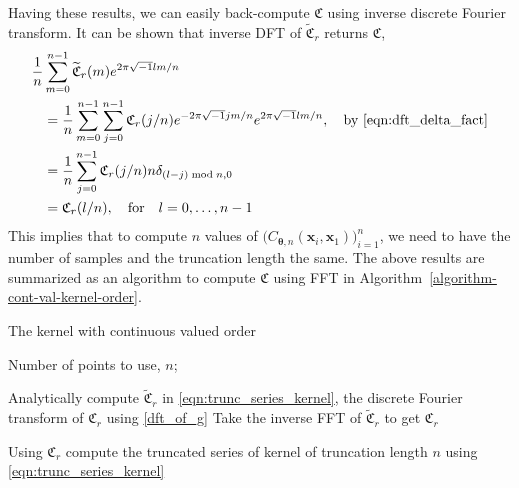\documentclass{svjour3}                     %
\newcommand{\bm}[1]{\boldsymbol{#1}}
\newcommand{\vtheta}{{\bm{\theta}}}
\newcommand{\vx}{\bm{x}}
\begin{document}
Having these results, we can easily back-compute $\mathfrak{C}$ using inverse discrete Fourier transform. It can be shown that inverse DFT of $\widetilde{\mathfrak{C}}_{r}$ returns $\mathfrak{C}$,
\begin{align*}
\frac{1}{n} &\sum_{m=0}^{n-1} \widetilde{\mathfrak{C}}_{r} (m) e^{2 \pi\sqrt{-1} lm/n} \\
& = \frac{1}{n} \sum_{m=0}^{n-1} 
\sum_{j=0}^{n-1} \mathfrak{C}_{r} (j/n) e^{- 2 \pi\sqrt{-1} jm/n}
e^{2 \pi\sqrt{-1} lm/n}, \quad \text{by \eqref{eqn:dft_delta_fact}}  \\
& = \frac{1}{n}  \sum_{j=0}^{n-1} \mathfrak{C}_{r} (j/n) n \delta_{(l-j) \bmod n, 0} \\
& = \mathfrak{C}_{r} (l/n), \quad \text{for} \quad l=0,\dots,n-1
\end{align*}
This implies that to compute $n$ values of $\biggl( C_{\vtheta, n}(\vx_i, \vx_1) \biggr)_{i=1}^n$, we need to have the number of samples and the truncation length the same. 
The above results are summarized as an algorithm to compute $\mathfrak{C}$ using FFT in Algorithm~\ref{algorithm-cont-val-kernel-order}.
\begin{algorithm}
	\caption{The kernel with continuous valued order}\label{algorithm-cont-val-kernel-order}
	\begin{algorithmic}[1]
		
		\Require
		Number of points to use, $n$; 
		
		\State Analytically compute $ \widetilde{\bm{\mathfrak{C}}}_r $ in \eqref{eqn:trunc_series_kernel}, the discrete Fourier transform of ${\bm{\mathfrak{C}}}_r$ using \eqref{dft_of_g}
		\State Take the inverse FFT of $\widetilde{\bm{\mathfrak{C}}}_r$ to get ${\bm{\mathfrak{C}}}_r$
		
		\State Using ${\bm{\mathfrak{C}}}_r$ compute the truncated series of kernel of truncation length $n$ using \eqref{eqn:trunc_series_kernel}
		
	\end{algorithmic}
	
\end{algorithm}
\end{document}
